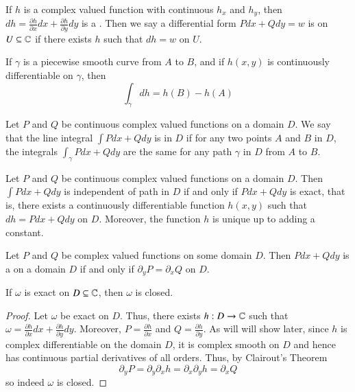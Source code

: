 \documentclass[12pt, a4paper, oneside, openright, titlepage]{book}
\begin{document}
\begin{defn}
    If $h$ is a complex valued function with continuous $h_x$ and $h_y$, then $dh = \frac{\partial h}{\partial x}dx + \frac{\partial h}{\partial y}dy$ is a . Then we say a differential form $Pdx+Qdy = w$ is  on $U \subseteq \mathbb C$ if there exists $h$ such that $dh = w$ on $U$.
\end{defn}

\begin{namthm}
    If $\gamma$ is a piecewise smooth curve from $A$ to $B$, and if $h(x,y)$ is continuously differentiable on $\gamma$, then \begin{equation*}
        \int_{\gamma}dh = h(B) - h(A)
    \end{equation*}
\end{namthm}


\begin{defn}
    Let $P$ and $Q$ be continuous complex valued functions on a domain $D$. We say that the line integral $\int Pdx+Qdy$ is  in $D$ if for any two points $A$ and $B$ in $D$, the integrals $\int_{\gamma}Pdx+Qdy$ are the same for any path $\gamma$ in $D$ from $A$ to $B$.
\end{defn}

\begin{lem}
    Let $P$ and $Q$ be continuous complex valued functions on a domain $D$. Then $\int Pdx+Qdy$ is independent of path in $D$ if and only if $Pdx+Qdy$ is exact, that is, there exists a continuously differentiable function $h(x,y)$ such that $dh = Pdx+Qdy$ on $D$. Moreover, the function $h$ is unique up to adding a constant.
\end{lem}



\begin{defn}
    Let $P$ and $Q$ be complex valued functions on some domain $D$. Then $Pdx+Qdy$ is a  on a domain $D$ if and only if $\partial_yP = \partial_xQ$ on $D$.
\end{defn}

\begin{prop}
    If $\omega$ is exact on $D \subseteq \mathbb C$, then $\omega$ is closed.
\end{prop}
\begin{proof}
    Let $\omega$ be exact on $D$. Thus, there exists $h:D\rightarrow \mathbb C$ such that $\omega = \frac{\partial h}{\partial x}dx+\frac{\partial h}{\partial y}dy$. Moreover, $P = \frac{\partial h}{\partial x}$ and $Q = \frac{\partial h}{\partial y}$. As will will show later, since $h$ is complex differentiable on the domain $D$, it is complex smooth on $D$ and hence has continuous partial derivatives of all orders. Thus, by Clairout's Theorem $$\partial_yP = \partial_y \partial_xh = \partial_x\partial_yh = \partial_xQ$$
    so indeed $\omega$ is closed.
\end{proof}
\end{document}
